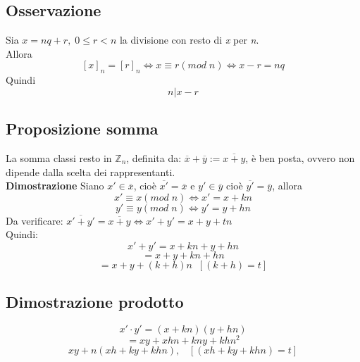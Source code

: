 \subsection{Osservazione}
Sia \(x=nq+r,\;0\leq r<n\) la divisione con resto di \textit{x} per \textit{n}.\\
Allora \[[x]_n=[r]_n\Leftrightarrow x\equiv r(mod\;n)\Leftrightarrow x-r=nq\]
Quindi \[n|x-r\]

\subsection{Proposizione somma}
La somma classi resto in \(\mathbb{Z}_n\), definita da: \(\overline{x}+\overline{y}:= \overline{x+y}\), è ben posta, ovvero non dipende dalla scelta dei rappresentanti.
\\
\textbf{Dimostrazione}
Siano \(x'\in\overline{x}\), cioè \(\overline{x'}=\overline{x}\) e \(y'\in\overline{y}\) cioè \(\overline{y'}=\overline{y}\), allora\\
\[x'\equiv x(mod\;n)\Leftrightarrow x'=x+kn\]
\[y'\equiv y(mod\;n)\Leftrightarrow y'=y+hn\]
Da verificare: \(\overline{x'+y'}=\overline{x+y}\Leftrightarrow x'+y'=x+y+tn\)
\\Quindi:
\[x'+y'=x+kn+y+hn\]
\[=x+y+kn+hn\]
\[=x+y+(k+h)n\;\;[(k+h)=t]\]

\subsection{Dimostrazione prodotto}
\[x'\cdot y'= (x+kn)(y+hn)\]
\[=xy+xhn+kny+khn^2\]
\[xy+n(xh+ky+khn),\;\;\;[(xh+ky+khn)=t]\]


